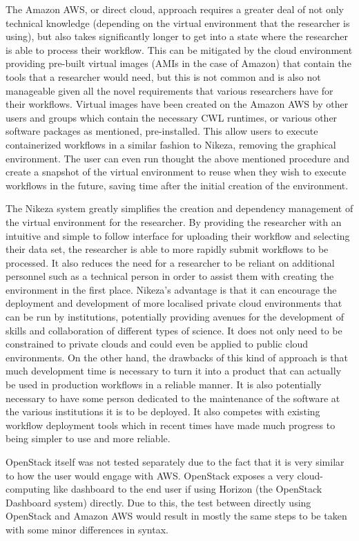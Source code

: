 The Amazon AWS, or direct cloud, approach requires a greater deal of not only technical knowledge (depending on the virtual environment that the researcher is using), but also takes significantly longer to get into a state where the researcher is able to process their workflow. This can be mitigated by the cloud environment providing pre-built virtual images (AMIs in the case of Amazon) that contain the tools that a researcher would need, but this is not common and is also not manageable given all the novel requirements that various researchers have for their workflows. Virtual images have been created on the Amazon AWS by other users and groups which contain the necessary CWL runtimes, or various other software packages as mentioned, pre-installed. This allow users to execute containerized workflows in a similar fashion to Nikeza, removing the graphical environment. The user can even run thought the above mentioned procedure and create a snapshot of the virtual environment to reuse when they wish to execute workflows in the future, saving time after the initial creation of the environment.

The Nikeza system greatly simplifies the creation and dependency management of the virtual environment for the researcher. By providing the researcher with an intuitive and simple to follow interface for uploading their workflow and selecting their data set, the researcher is able to more rapidly submit workflows to be processed. It also reduces the need for a researcher to be reliant on additional personnel such as a technical person in order to assist them with creating the environment in the first place. Nikeza's advantage is that it can encourage the deployment and development of more localised private cloud environments that can be run by institutions, potentially providing avenues for the development of skills and collaboration of different types of science. It does not only need to be constrained to private clouds and could even be applied to public cloud environments. 
On the other hand, the drawbacks of this kind of approach is that much development time is necessary to turn it into a product that can actually be used in production workflows in a reliable manner. It is also potentially necessary to have some person dedicated to the maintenance of the software at the various institutions it is to be deployed. It also competes with existing workflow deployment tools which in recent times have made much progress to being simpler to use and more reliable.

OpenStack itself was not tested separately due to the fact that it is very similar to how the user would engage with AWS. OpenStack exposes a very cloud-computing like dashboard to the end user if using Horizon (the OpenStack Dashboard system) directly. Due to this, the test between directly using OpenStack and Amazon AWS would result in mostly the same steps to be taken with some minor differences in syntax.

